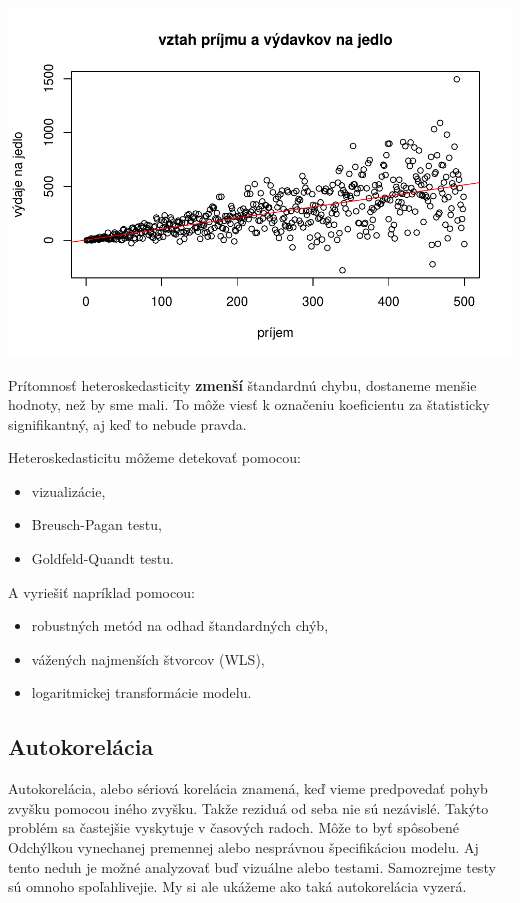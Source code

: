 \documentclass[]{article}
\providecommand{\tightlist}{%
  \setlength{\itemsep}{0pt}\setlength{\parskip}{0pt}}
\begin{document}
\includegraphics{test_files/figure-latex/unnamed-chunk-51-1.pdf}

Prítomnosť heteroskedasticity \textbf{zmenší} štandardnú chybu,
dostaneme menšie hodnoty, než by sme mali. To môže viesť k označeniu
koeficientu za štatisticky signifikantný, aj keď to nebude pravda.

Heteroskedasticitu môžeme detekovať pomocou:

\begin{itemize}
\tightlist
\item
  vizualizácie,
\item
  Breusch-Pagan testu,
\item
  Goldfeld-Quandt testu.
\end{itemize}

A vyriešiť napríklad pomocou:

\begin{itemize}
\tightlist
\item
  robustných metód na odhad štandardných chýb,
\item
  vážených najmenších štvorcov (WLS),
\item
  logaritmickej transformácie modelu.
\end{itemize}

\hypertarget{autokoreluxe1cia}{%
\subsection{Autokorelácia}\label{autokoreluxe1cia}}

Autokorelácia, alebo sériová korelácia znamená, keď vieme predpovedať
pohyb zvyšku pomocou iného zvyšku. Takže reziduá od seba nie sú
nezávislé. Takýto problém sa častejšie vyskytuje v časových radoch. Môže
to byť spôsobené Odchýlkou vynechanej premennej alebo nesprávnou
špecifikáciou modelu. Aj tento neduh je možné analyzovať buď vizuálne
alebo testami. Samozrejme testy sú omnoho spoľahlivejie. My si ale
ukážeme ako taká autokorelácia vyzerá.
\end{document}
